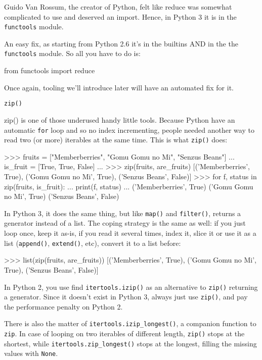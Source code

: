 Guido Van Rossum, the creator of Python, felt like reduce was somewhat complicated to use and deserved an import. Hence, in Python 3 it is in the \lstinline{functools} module.

An easy fix, as starting from Python 2.6 it's in the builtins AND in the the \lstinline{functools} module. So all you have to do is:

\begin{py2and3}
from functools import reduce
\end{py2and3}

Once again, tooling we'll introduce later will have an automated fix for it.

\lstinline{zip()}

{zip()} is one of those underused handy little tools. Because Python have an automatic \lstinline{for} loop and so no index incrementing, people needed another way to read two (or more) \glspl{iterable} at the same time. This is what \lstinline{zip()} does:

\begin{py2}
>>> fruits = ["Memberberries", "Gomu Gomu no Mi", "Senzus Beans"]
... is_fruit = [True, True, False]
...
>>> zip(fruits, are_fruits)
[('Memberberries', True), ('Gomu Gomu no Mi', True), ('Senzus Beans', False)]
>>> for f, status in zip(fruits, is_fruit):
...     print(f, status)
...
('Memberberries', True)
('Gomu Gomu no Mi', True)
('Senzus Beans', False)
\end{py2}

In Python 3, it does the same thing, but like \lstinline{map()} and \lstinline{filter()}, returns a generator instead of a list. The coping strategy is the same as well: if you just loop once, keep it as-is, if you read it several times, index it, slice it or use it as a list (\lstinline{append()}, \lstinline{extend()}, etc), convert it to a list before:

\begin{py2and3}
>>> list(zip(fruits, are_fruits))
[('Memberberries', True), ('Gomu Gomu no Mi', True), ('Senzus Beans', False)]
\end{py2and3}

In Python 2, you use find \lstinline{itertools.izip()} as an alternative to \lstinline{zip()} returning a generator. Since it doesn't exist in Python 3, always just use \lstinline{zip()}, and pay the performance penalty on Python 2.

There is also the matter of \lstinline{itertools.izip_longest()}, a companion function to \lstinline{zip}. In case of looping on two iterables of different length, \lstinline{zip()} stops at the shortest, while \lstinline{itertools.zip_longest()} stops at the longest, filling the missing values with \lstinline{None}.

